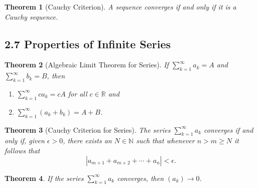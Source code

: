 \documentclass{amsart}
\newtheorem*{theorem}{Theorem}
\theoremstyle{definition}
\newcommand{\N}{\mathbb{N}}
\newcommand{\R}{\mathbb{R}}
\newcommand{\abs}[1]{|#1|}
\begin{document}
\begin{theorem}[Cauchy Criterion]
  A sequence converges if and only if it is a Cauchy sequence.
\end{theorem}

\subsection*{2.7 Properties of Infinite Series}

\begin{theorem}[Algebraic Limit Theorem for Series]
  If $\sum_{k=1}^\infty a_k = A$ and $\sum_{k=1}^\infty b_k = B$, then
  \begin{enumerate}[label={(\roman*)}]
    \item $\sum_{k=1}^\infty c a_k = c A$ for all $c \in \R$ and
    \item $\sum_{k=1}^\infty (a_k + b_k) = A + B$.
  \end{enumerate}
\end{theorem}

\begin{theorem}[Cauchy Criterion for Series]
  The series $\sum_{k=1}^\infty a_k$ converges if and only if, given $\epsilon >
  0$, there exists an $N \in \N$ such that whenever $n > m \ge N$ it follows
  that
  \[
    \abs{a_{m+1} + a_{m+2} + \cdots + a_{n}} < \epsilon.
  \]
\end{theorem}

\begin{theorem}
  If the series $\sum_{k=1}^\infty a_k$ converges, then $(a_k) \rightarrow 0$.
\end{theorem}
\end{document}
